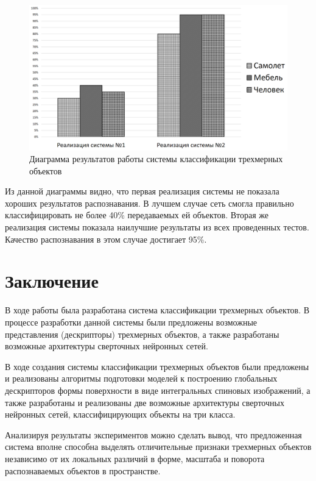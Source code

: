 \documentclass[14pt]{article}
\numberwithin{figure}{section}
\numberwithin{equation}{section}
\begin{document}
\begin{figure}[h]
   \begin{center}
       \includegraphics[scale=0.41] {13.JPG}
       \caption{Диаграмма результатов работы системы классификации трехмерных объектов}
       \label{ris:13}
   \end{center}
\end{figure}

Из данной диаграммы видно, что первая реализация системы не показала хороших результатов распознавания. В лучшем случае сеть смогла правильно классифицировать не более 40\% передаваемых ей объектов. Вторая же реализация системы показала наилучшие результаты из всех проведенных тестов. Качество распознавания в этом случае достигает 95\%.

\newpage
{}
\section*{Заключение}

В ходе работы была разработана система классификации трехмерных объектов. В процессе разработки данной системы были предложены возможные представления (дескрипторы) трехмерных объектов, а также разработаны возможные архитектуры сверточных нейронных сетей.

В ходе создания системы классификации трехмерных объектов были предложены и реализованы алгоритмы подготовки моделей к построению глобальных дескрипторов формы поверхности в виде интегральных спиновых изображений, а также разработаны и реализованы две возможные архитектуры сверточных нейронных сетей, классифицирующих объекты на три класса.

Анализируя результаты экспериментов можно сделать вывод, что предложенная система вполне способна выделять отличительные признаки трехмерных объектов независимо от их локальных различий в форме, масштаба и поворота распознаваемых объектов в пространстве.
\end{document}
